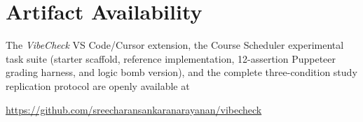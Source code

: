 \documentclass[sigconf]{acmart}
\begin{document}
\section*{Artifact Availability}
  The \textit{VibeCheck} VS Code/Cursor extension, the Course Scheduler experimental task suite (starter scaffold, reference implementation, 12-assertion Puppeteer grading harness, and logic bomb version), and the complete three-condition study replication protocol are openly available at
  \begin{sloppypar}
  \url{https://github.com/sreecharansankaranarayanan/vibecheck}
  \end{sloppypar}



\end{document}
